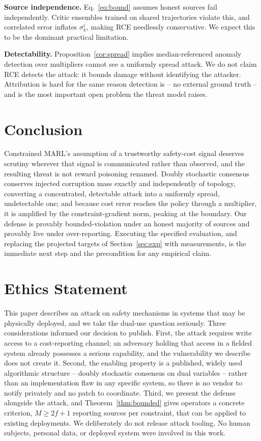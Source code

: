 \documentclass{article}
\begin{document}
\textbf{Source independence.} Eq.~\eqref{eq:bound} assumes honest sources fail independently. Critic ensembles trained on shared trajectories violate this, and correlated error inflates $\sigma^i_k$, making RCE needlessly conservative. We expect this to be the dominant practical limitation.

\textbf{Detectability.} Proposition~\ref{cor:spread} implies median-referenced anomaly detection over multipliers cannot see a uniformly spread attack. We do not claim RCE detects the attack: it bounds damage without identifying the attacker. Attribution is hard for the same reason detection is -- no external ground truth -- and is the most important open problem the threat model raises.

\section{Conclusion}
\label{sec:conclusion}

Constrained MARL's assumption of a trustworthy safety-cost signal deserves scrutiny wherever that signal is communicated rather than observed, and the resulting threat is not reward poisoning renamed. Doubly stochastic consensus conserves injected corruption mass exactly and independently of topology, converting a concentrated, detectable attack into a uniformly spread, undetectable one; and because cost error reaches the policy through a multiplier, it is amplified by the constraint-gradient norm, peaking at the boundary. Our defense is provably bounded-violation under an honest majority of sources and provably live under over-reporting. Executing the specified evaluation, and replacing the projected targets of Section~\ref{sec:exp} with measurements, is the immediate next step and the precondition for any empirical claim.

\section*{Ethics Statement}

This paper describes an attack on safety mechanisms in systems that may be physically deployed, and we take the dual-use question seriously. Three considerations informed our decision to publish. First, the attack requires write access to a cost-reporting channel; an adversary holding that access in a fielded system already possesses a serious capability, and the vulnerability we describe does not create it. Second, the enabling property is a published, widely used algorithmic structure -- doubly stochastic consensus on dual variables -- rather than an implementation flaw in any specific system, so there is no vendor to notify privately and no patch to coordinate. Third, we present the defense alongside the attack, and Theorem~\ref{thm:bounded} gives operators a concrete criterion, $M \ge 2f+1$ reporting sources per constraint, that can be applied to existing deployments. We deliberately do not release attack tooling. No human subjects, personal data, or deployed system were involved in this work.
\end{document}
